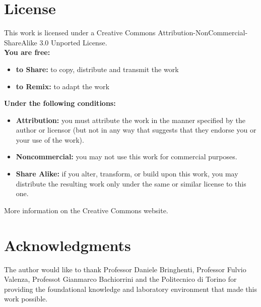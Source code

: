 \section*{License}

This work is licensed under a Creative Commons Attribution-NonCommercial-ShareAlike 3.0 Unported License.\\

\noindent
\textbf{You are free:}
\begin{itemize}
    \item \textbf{to Share:} to copy, distribute and transmit the work
    \item \textbf{to Remix:} to adapt the work
\end{itemize}

\textbf{Under the following conditions:}
\begin{itemize}
    \item \textbf{Attribution:} you must attribute the work in the manner specified by the author or licensor (but not in any way that suggests that they endorse you or your use of the work).
    \item \textbf{Noncommercial:} you may not use this work for commercial purposes.
    \item \textbf{Share Alike:} if you alter, transform, or build upon this work, you may distribute the resulting work only under the same or similar license to this one.
\end{itemize}

More information on the Creative Commons website.

\section*{Acknowledgments}

The author would like to thank Professor Daniele Bringhenti, Professor Fulvio Valenza, Professot Gianmarco Bachiorrini and the Politecnico di Torino for providing the foundational knowledge and laboratory environment that made this work possible.
